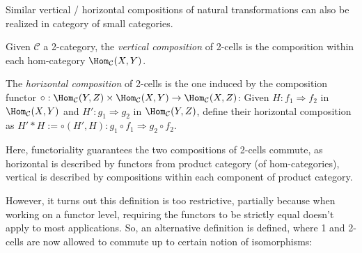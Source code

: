 \documentclass{article}
\begin{document}
Similar vertical / horizontal compositions of natural transformations can also be realized in category of small categories.

\hfil

\begin{defn}
    Given $\mathcal{C}$ a 2-category, the \emph{vertical composition} of 2-cells is the composition within each hom-category $\Hom_\mathcal{C}(X,Y)$.
    
    The \emph{horizontal composition} of 2-cells is the one induced by the composition functor $\circ:\Hom_\mathcal{C}(Y,Z)\times \Hom_\mathcal{C}(X,Y)\rightarrow \Hom_\mathcal{C}(X,Z)$: Given $H:f_1\Rightarrow f_2$ in $\Hom_\mathcal{C}(X,Y)$ and $H':g_1\Rightarrow g_2$ in $\Hom_\mathcal{C}(Y,Z)$, define their horizontal composition as $H'*H:= \circ(H',H):g_1\circ f_1\Rightarrow g_2\circ f_2$.
\end{defn}

Here, functoriality guarantees the two compositions of 2-cells commute, as horizontal is described by functors from product category (of hom-categories), vertical is described by compositions within each component of product category.

\hfil

However, it turns out this definition is too restrictive, partially because when working on a functor level, requiring the functors to be strictly equal doesn't apply to most applications. So, an alternative definition is defined, where 1 and 2-cells are now allowed to commute up to certain notion of isomorphisms:
\end{document}
